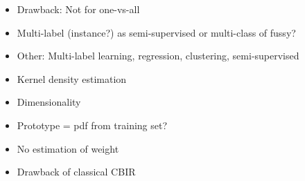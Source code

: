 \begin{itemize}
  \item Drawback: Not for one-vs-all
  \item Multi-label (instance?) as semi-supervised or multi-class of fussy?
  \item Other: Multi-label learning, regression, clustering, semi-supervised
  \item Kernel density estimation
  \item Dimensionality
  \item Prototype = pdf from training set?
  \item No estimation of weight
  \item Drawback of classical CBIR
\end{itemize}